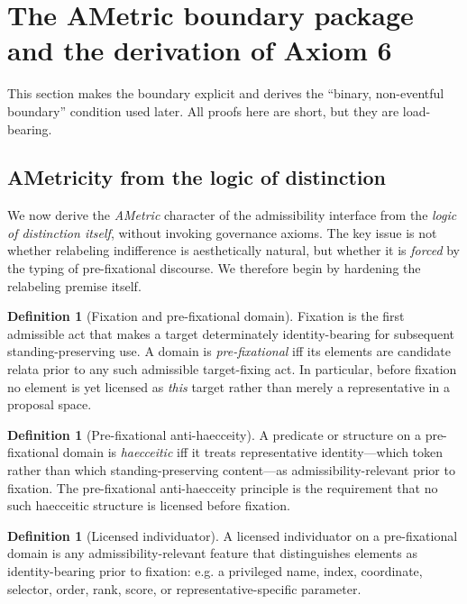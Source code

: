 \documentclass[11pt]{article}
\theoremstyle{definition}
\newtheorem{definition}[theorem]{Definition}
\begin{document}
\section{The AMetric boundary package and the derivation of Axiom 6}
\label{sec:ametric}

This section makes the boundary explicit and derives the ``binary, non-eventful boundary'' condition used later.
All proofs here are short, but they are load-bearing.


\subsection{AMetricity from the logic of distinction}
\label{sec:ametric-distinction}

We now derive the \emph{AMetric} character of the admissibility interface from the \emph{logic of distinction itself},
without invoking governance axioms.
The key issue is not whether relabeling indifference is aesthetically natural, but whether it is \emph{forced} by the typing of pre-fixational discourse.
We therefore begin by hardening the relabeling premise itself.

\begin{definition}[Fixation and pre-fixational domain]
\label{def:pre-fixational-domain}
Fixation is the first admissible act that makes a target determinately identity-bearing for subsequent standing-preserving use.
A domain is \emph{pre-fixational} iff its elements are candidate relata prior to any such admissible target-fixing act.
In particular, before fixation no element is yet licensed as \emph{this} target rather than merely a representative in a proposal space.
\end{definition}

\begin{definition}[Pre-fixational anti-haecceity]
\label{def:anti-haecceity}
A predicate or structure on a pre-fixational domain is \emph{haecceitic} iff it treats representative identity---which token rather than which standing-preserving content---as admissibility-relevant prior to fixation.
The pre-fixational anti-haecceity principle is the requirement that no such haecceitic structure is licensed before fixation.
\end{definition}

\begin{definition}[Licensed individuator]
\label{def:licensed-individuator}
A licensed individuator on a pre-fixational domain is any admissibility-relevant feature that distinguishes elements as identity-bearing prior to fixation: e.g. a privileged name, index, coordinate, selector, order, rank, score, or representative-specific parameter.
\end{definition}
\end{document}
